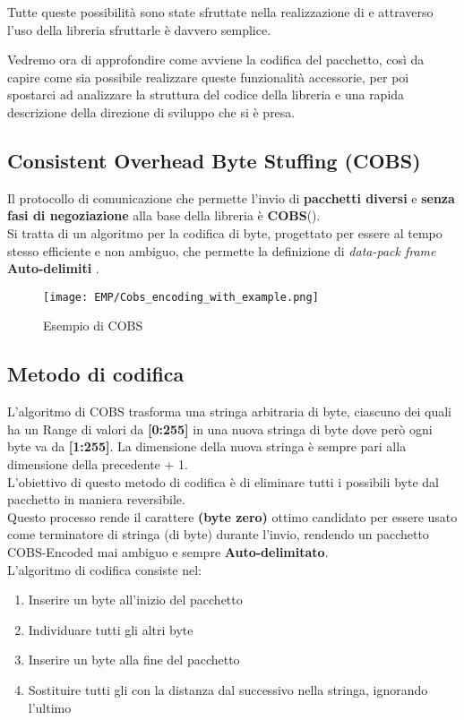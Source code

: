 Tutte queste possibilità sono state sfruttate nella realizzazione di \cite*{EMP} e attraverso l'uso della libreria sfruttarle è davvero semplice.

Vedremo ora di approfondire come avviene la codifica del pacchetto, così da capire come sia possibile realizzare queste funzionalità accessorie, per poi spostarci ad analizzare la struttura del codice della libreria e una rapida descrizione della direzione di sviluppo che si è presa. 

\newpage

\subsection*{Consistent Overhead Byte Stuffing (COBS)}
Il protocollo di comunicazione che permette l’invio di \textbf{pacchetti diversi} e \textbf{senza fasi di negoziazione} alla base della libreria è \textbf{COBS}(\cite{COBS}).\\
Si tratta di un algoritmo per la codifica di byte, progettato per essere al tempo stesso efficiente e non ambiguo, che permette la definizione di \textit{data-pack frame} \textbf{Auto-delimiti} .

\begin{figure}[H]
	\centering
	\caption[Esempio di COBS]{Esempio di COBS}
	\texttt{[image: EMP/Cobs\_encoding\_with\_example.png]}
\end{figure}

\subsection{Metodo di codifica}
L'algoritmo di COBS trasforma una stringa arbitraria di byte, ciascuno dei quali ha un Range di valori da \textbf{[0:255]} in una nuova stringa di byte dove però ogni byte va da \textbf{[{\color{red}1}:255]}. La dimensione della nuova stringa è sempre pari alla dimensione della precedente + 1.\\
L'obiettivo di questo metodo di codifica è di eliminare tutti i possibili byte \zeroByte dal pacchetto in maniera reversibile.\\
Questo processo rende il carattere \textbf{\zeroByte (byte zero)} ottimo candidato per essere usato come terminatore di stringa (di byte) durante l'invio, rendendo un pacchetto COBS-Encoded mai ambiguo e sempre \textbf{Auto-delimitato}.\\
L'algoritmo di codifica consiste nel:\vspace{-5mm}
\begin{enumerate} [itemsep=-3mm]
	\item Inserire un byte \zeroByte all'inizio del pacchetto
	\item Individuare tutti gli altri byte \zeroByte
	\item Inserire un byte \zeroByte alla fine del pacchetto
	\item Sostituire tutti gli \zeroByte con la distanza dal successivo \zeroByte nella stringa, ignorando l'ultimo
\end{enumerate}\vspace{-8mm}

